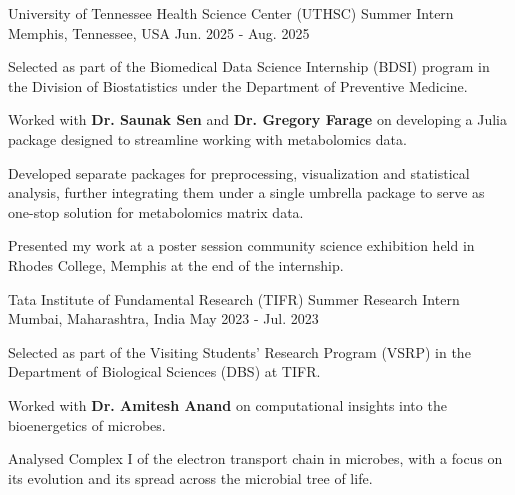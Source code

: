 

\begin{cventries}

  \cventry
  {University of Tennessee Health Science Center (UTHSC)} %
  {Summer Intern} %
  {Memphis, Tennessee, USA} %
  {Jun. 2025 - Aug. 2025} %
  {
    \begin{cvitems}
      \item {Selected as part of the Biomedical Data Science Internship (BDSI) program
      in the Division of Biostatistics under the Department of Preventive Medicine.}
      \item {Worked with \textbf{Dr. Saunak Sen} and \textbf{Dr. Gregory Farage} on
      developing a Julia package designed to streamline working with metabolomics data.}
      \item {Developed separate packages for preprocessing, visualization and statistical
      analysis, further integrating them under a single umbrella package to serve as one-stop
      solution for metabolomics matrix data.}
      \item {Presented my work at a poster session community science exhibition held in
      Rhodes College, Memphis at the end of the internship.}
    \end{cvitems}
  }

  \cventry
    {Tata Institute of Fundamental Research (TIFR)} %
    {Summer Research Intern} %
    {Mumbai, Maharashtra, India} %
    {May 2023 - Jul. 2023} %
    {
      \begin{cvitems}
        \item {Selected as part of the Visiting Students' Research Program (VSRP)
        in the Department of Biological Sciences (DBS) at TIFR.}
        \item {Worked with \textbf{Dr. Amitesh Anand} on computational insights into the
        bioenergetics of microbes.}
        \item {Analysed Complex I of the electron transport chain in microbes,
        with a focus on its evolution and its spread across the microbial tree of life.}
      \end{cvitems}
    }


\end{cventries}
